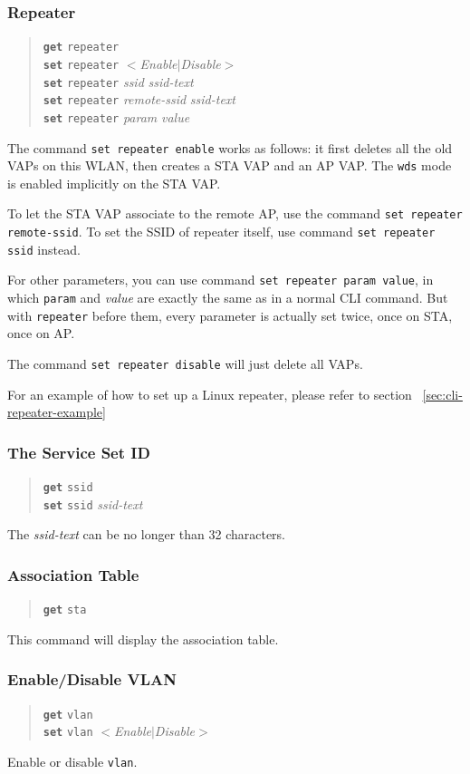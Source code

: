 \documentclass[10pt,fullpage]{article}
\newcommand{\mytt}[1]{{\texttt{#1}}}
\newcommand{\bv}{\begin{verse}}
\newcommand{\ev}{\end{verse}}
\newcommand{\clicmd}[1]{{\textbf{\texttt{#1}}}}
\newcommand{\cliparam}[1]{{\texttt{#1}}}
\newcommand{\clival}[1]{{\emph{#1}}}
\begin{document}
\subsubsection{Repeater}
\label{sec:cli-repeater}
\bv
\clicmd{get} \cliparam{repeater}\\
\clicmd{set} \cliparam{repeater} $<$\clival{Enable}$|$\clival{Disable}$>$\\
\clicmd{set} \cliparam{repeater} \clival{ssid} \clival{ssid-text}\\
\clicmd{set} \cliparam{repeater} \clival{remote-ssid} \clival{ssid-text}\\
\clicmd{set} \cliparam{repeater} \clival{param} \clival{value}\\
\ev
The command \mytt{set repeater enable} works as follows: it first deletes
all the old VAPs on this WLAN, then creates a STA VAP and an AP VAP.
The \cliparam{wds} mode is enabled implicitly on the STA VAP.

To let the STA VAP associate to the remote AP, use the command
\mytt{set repeater remote-ssid}. To set the SSID of repeater itself,
use command \mytt{set repeater ssid} instead.

For other parameters, you can use command \mytt{set repeater param value},
in which \cliparam{param} and \clival{value} are exactly the same as in
a normal CLI command. But with \cliparam{repeater} before them, every
parameter is actually set twice, once on STA, once on AP.

The command \mytt{set repeater disable} will just delete all VAPs.

For an example of how to set up a Linux repeater, 
please refer to section ~\ref{sec:cli-repeater-example}

\subsubsection{The Service Set ID}
\bv
\clicmd{get} \cliparam{ssid}\\
\clicmd{set} \cliparam{ssid} \clival{ssid-text}
\ev
The \clival{ssid-text} can be no longer than 32 characters.

\subsubsection{Association Table}
\bv
\clicmd{get} \cliparam{sta}
\ev
This command will display the association table.

\subsubsection{Enable/Disable VLAN}
\bv
\clicmd{get} \cliparam{vlan}\\
\clicmd{set} \cliparam{vlan} $<$\clival{Enable}$|$\clival{Disable}$>$
\ev
Enable or disable \cliparam{vlan}.
\end{document}
